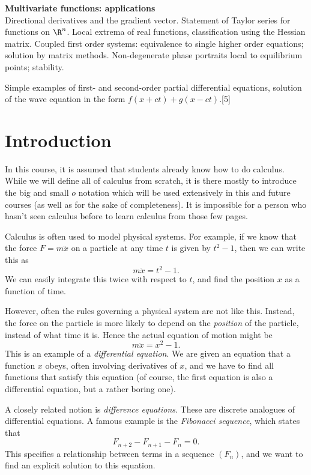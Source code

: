 \documentclass[a4paper]{article}
\begin{document}
{  \vspace{10pt}
  \noindent\textbf{Multivariate functions: applications}\\
  Directional derivatives and the gradient vector. Statement of Taylor series for functions on $\R^n$. Local extrema of real functions, classification using the Hessian matrix. Coupled first order systems: equivalence to single higher order equations; solution by matrix methods. Non-degenerate phase portraits local to equilibrium points; stability.

  \vspace{5pt}
  \noindent Simple examples of first- and second-order partial differential equations, solution of the wave equation in the form $f(x + ct) + g(x - ct)$.\hspace*{\fill}[5]}
\tableofcontents

\setcounter{section}{-1}
\section{Introduction}
In this course, it is assumed that students already know how to do calculus. While we will define all of calculus from scratch, it is there mostly to introduce the big and small $o$ notation which will be used extensively in this and future courses (as well as for the sake of completeness). It is impossible for a person who hasn't seen calculus before to learn calculus from those few pages.

Calculus is often used to model physical systems. For example, if we know that the force $F = m\ddot x$ on a particle at any time $t$ is given by $t^2 - 1$, then we can write this as
\[
  m\ddot x = t^2 - 1.
\]
We can easily integrate this twice with respect to $t$, and find the position $x$ as a function of time.

However, often the rules governing a physical system are not like this. Instead, the force on the particle is more likely to depend on the \emph{position} of the particle, instead of what time it is. Hence the actual equation of motion might be
\[
  m\ddot x = x^2 - 1.
\]
This is an example of a \emph{differential equation}. We are given an equation that a function $x$ obeys, often involving derivatives of $x$, and we have to find all functions that satisfy this equation (of course, the first equation is also a differential equation, but a rather boring one).

A closely related notion is \emph{difference equations}. These are discrete analogues of differential equations. A famous example is the \emph{Fibonacci sequence}, which states that
\[
  F_{n + 2} - F_{n + 1} - F_n = 0.
\]
This specifies a relationship between terms in a sequence $(F_n)$, and we want to find an explicit solution to this equation.
\end{document}
